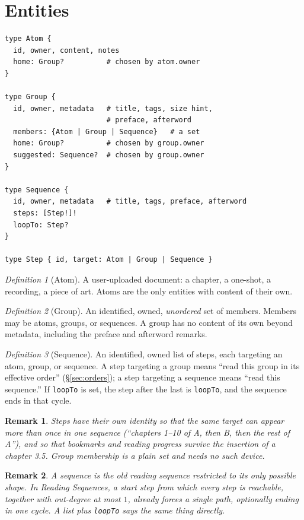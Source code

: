 \documentclass{amsart}
\newtheorem{rem}{Remark}
\theoremstyle{remark}
\newtheorem{defn}{Definition}
\begin{document}
\section{Entities}
\begin{lstlisting}[frame=single,basicstyle=\small]
type Atom {
  id, owner, content, notes
  home: Group?          # chosen by atom.owner
}

type Group {
  id, owner, metadata   # title, tags, size hint,
                        # preface, afterword
  members: {Atom | Group | Sequence}   # a set
  home: Group?          # chosen by group.owner
  suggested: Sequence?  # chosen by group.owner
}

type Sequence {
  id, owner, metadata   # title, tags, preface, afterword
  steps: [Step!]!
  loopTo: Step?
}

type Step { id, target: Atom | Group | Sequence }
\end{lstlisting}

\begin{defn}[Atom]A user-uploaded document: a chapter, a one-shot, a recording, a piece of art. Atoms are the only entities with content of their own.\end{defn}

\begin{defn}[Group]An identified, owned, \emph{unordered} set of members. Members may be atoms, groups, or sequences. A group has no content of its own beyond metadata, including the preface and afterword remarks.\end{defn}

\begin{defn}[Sequence]An identified, owned list of steps, each targeting an atom, group, or sequence. A step targeting a group means ``read this group in its effective order'' (\S\ref{sec:orders}); a step targeting a sequence means ``read this sequence.'' If \lstinline|loopTo| is set, the step after the last is \lstinline|loopTo|, and the sequence ends in that cycle.\end{defn}

\begin{rem}Steps have their own identity so that the same target can appear more than once in one sequence (``chapters 1--10 of A, then B, then the rest of A''), and so that bookmarks and reading progress survive the insertion of a chapter 3.5. Group membership is a plain set and needs no such device.\end{rem}

\begin{rem}A sequence is the old reading sequence restricted to its only possible shape. In \emph{Reading Sequences}, a start step from which every step is reachable, together with out-degree at most $1$, already forces a single path, optionally ending in one cycle. A list plus \lstinline|loopTo| says the same thing directly.\end{rem}
\end{document}
